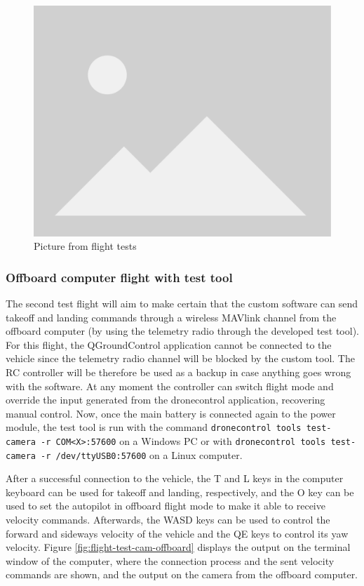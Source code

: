 \begin{figure}
  \centering
  \includegraphics[width=.6\textwidth, keepaspectratio]{img/placeholder.png}
  \caption{Picture from flight tests}\label{fig:flight-test-basic}
\end{figure}

\subsubsection{Offboard computer flight with test tool}

The second test flight will aim to make certain that the custom software can send takeoff and landing commands through a wireless MAVlink channel from the offboard computer (by using the telemetry radio through the developed test tool).
For this flight, the QGroundControl application cannot be connected to the vehicle since the telemetry radio channel will be blocked by the custom tool.
The RC controller will be therefore be used as a backup in case anything goes wrong with the software.
At any moment the controller can switch flight mode and override the input generated from the dronecontrol application, recovering manual control.
Now, once the main battery is connected again to the power module, the test tool is run with the command \verb|dronecontrol tools test-camera -r COM<X>:57600| on a Windows PC or with \verb|dronecontrol tools test-camera -r /dev/ttyUSB0:57600| on a Linux computer.

After a successful connection to the vehicle, the T and L keys in the computer keyboard can be used for takeoff and landing, respectively, and the O key can be used to set the autopilot in offboard flight mode to make it able to receive velocity commands.
Afterwards, the WASD keys can be used to control the forward and sideways velocity of the vehicle and the QE keys to control its yaw velocity.
Figure \ref{fig:flight-test-cam-offboard} displays the output on the terminal window of the computer, where the connection process and the sent velocity commands are shown, and the output on the camera from the offboard computer.

